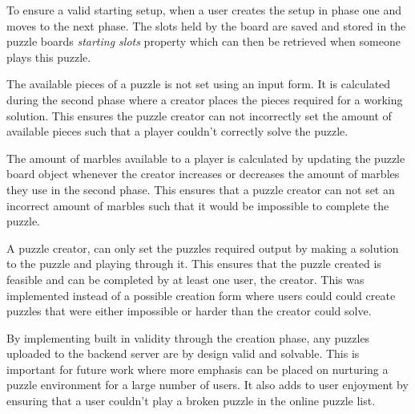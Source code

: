 \documentclass{l4proj}
\begin{document}
To ensure a valid starting setup, when a user creates the setup in phase one and moves to the next phase. The slots held by the board are saved and stored in the puzzle boards \emph{starting slots} property which can then be retrieved when someone plays this puzzle. 

The available pieces of a puzzle is not set using an input form. It is calculated during the second phase where a creator places the pieces required for a working solution. This ensures the puzzle creator can not incorrectly set the amount of available pieces such that a player couldn't correctly solve the puzzle. 

The amount of marbles available to a player is calculated by updating the puzzle board object whenever the creator increases or decreases the amount of marbles they use in the second phase. This ensures that a puzzle creator can not set an incorrect amount of marbles such that it would be impossible to complete the puzzle. 

A puzzle creator, can only set the puzzles required output by making a solution to the puzzle and playing through it. This ensures that the puzzle created is feasible and can be completed by at least one user, the creator. This was implemented instead of a possible creation form where users could could create puzzles that were either impossible or harder than the creator could solve.

By implementing built in validity through the creation phase, any puzzles uploaded to the backend server are by design valid and solvable. This is important for future work where more emphasis can be placed on nurturing a puzzle environment for a large number of users. It also adds to user enjoyment by ensuring that a user couldn't play a broken puzzle in the online puzzle list.

\end{document}
